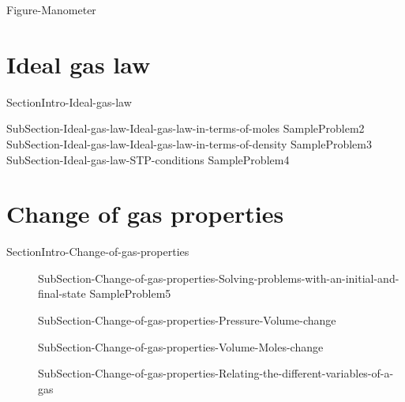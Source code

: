 \documentclass[main.tex]{subfiles}
\begin{document}
 {Figure-Manometer}
 \section{Ideal gas law}{SectionIntro-Ideal-gas-law}
\sloppy \begin{description}
 {SubSection-Ideal-gas-law-Ideal-gas-law-in-terms-of-moles}
{SampleProblem2}
 {SubSection-Ideal-gas-law-Ideal-gas-law-in-terms-of-density}
{SampleProblem3}
 {SubSection-Ideal-gas-law-STP-conditions}
{SampleProblem4}
\end{description}


 \section{Change of gas properties}{SectionIntro-Change-of-gas-properties}
\sloppy \begin{description}
\item[]  {SubSection-Change-of-gas-properties-Solving-problems-with-an-initial-and-final-state}
{SampleProblem5}
\item[] {SubSection-Change-of-gas-properties-Pressure-Volume-change}
 \item[] {SubSection-Change-of-gas-properties-Volume-Moles-change}
\item[]  {SubSection-Change-of-gas-properties-Relating-the-different-variables-of-a-gas}
\end{description}










 
\end{document}
